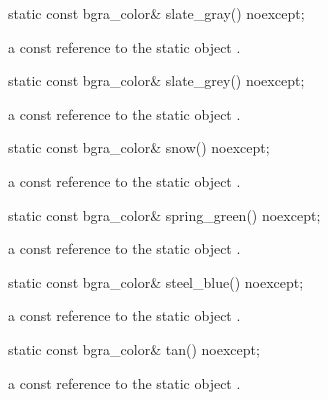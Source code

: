 \begin{itemdecl}
static const bgra_color& slate_gray() noexcept;
\end{itemdecl}
\begin{itemdescr}
\pnum
\returns
a const reference to the static  object .
\end{itemdescr}

\begin{itemdecl}
static const bgra_color& slate_grey() noexcept;
\end{itemdecl}
\begin{itemdescr}
\pnum
\returns
a const reference to the static  object .
\end{itemdescr}

\begin{itemdecl}
static const bgra_color& snow() noexcept;
\end{itemdecl}
\begin{itemdescr}
\pnum
\returns
a const reference to the static  object .
\end{itemdescr}

\begin{itemdecl}
static const bgra_color& spring_green() noexcept;
\end{itemdecl}
\begin{itemdescr}
\pnum
\returns
a const reference to the static  object .
\end{itemdescr}

\begin{itemdecl}
static const bgra_color& steel_blue() noexcept;
\end{itemdecl}
\begin{itemdescr}
\pnum
\returns
a const reference to the static  object .
\end{itemdescr}

\begin{itemdecl}
static const bgra_color& tan() noexcept;
\end{itemdecl}
\begin{itemdescr}
\pnum
\returns
a const reference to the static  object .
\end{itemdescr}

